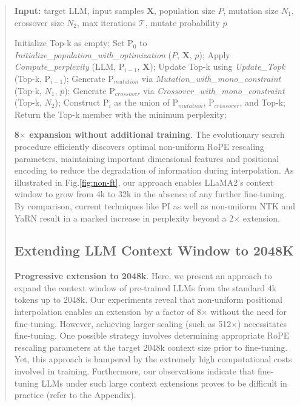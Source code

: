 \begin{abstract}
\begin{algorithm}[t]
	\small
	\caption{The search algorithm}
	\textbf{Input:} target LLM, input samples $\mathbf{X}$,   population size $P$, mutation size $N_1$, crossover size $N_2$, max iterations $\mathcal{T}$, mutate probability $p$\\

	\begin{algorithmic}[1]
		\label{alg:search}
		\STATE Initialize Top-k as empty;	
		\STATE Set $\text{P}_0$ to \textit{Initialize\_population\_with\_optimization} ($P$, $\mathbf{X}$, $p$); 
		\STATE Apply \textit{Compute\_perplexity} (LLM, $\text{P}_{i-1}$, $\mathbf{X}$);
		\STATE  Update Top-k using \textit{Update\_Topk} (Top-k, $\text{P}_{i-1}$);
		\STATE Generate $\text{P}_{mutation}$ via \textit{Mutation\_with\_mono\_constraint} (Top-k, $N_1$, $p$); 
		\STATE Generate $\text{P}_{crossover}$ via \textit{Crossover\_with\_mono\_constraint} (Top-k, $N_2$);
		\STATE Construct $\text{P}_i$ as the union of $\text{P}_{mutation}$, $\text{P}_{crossover}$, and Top-k;
		\ENDFOR
		\STATE Return the Top-k member with the minimum perplexity;
	\end{algorithmic}
\end{algorithm}

\textbf{8$\times$ expansion without additional training}. The evolutionary search procedure efficiently discovers optimal non-uniform RoPE rescaling parameters, maintaining important dimensional features and positional encoding to reduce the degradation of information during interpolation. As illustrated in Fig.\ref{fig:non-ft}, our approach enables LLaMA2’s context window to grow from 4k to 32k in the absence of any further fine-tuning. By comparison, current techniques like PI as well as non-uniform NTK and YaRN result in a marked increase in perplexity beyond a 2$\times$ extension.

\subsection{Extending LLM Context Window to 2048K}
\label{sec:extendto2048k}

\textbf{Progressive extension to 2048k}. Here, we present an approach to expand the context window of pre-trained LLMs from the standard 4k tokens up to 2048k. Our experiments reveal that non-uniform positional interpolation enables an extension by a factor of 8$\times$ without the need for fine-tuning. However, achieving larger scaling (such as 512$\times$) necessitates fine-tuning. One possible strategy involves determining appropriate RoPE rescaling parameters at the target 2048k context size prior to fine-tuning. Yet, this approach is hampered by the extremely high computational costs involved in training. Furthermore, our observations indicate that fine-tuning LLMs under such large context extensions proves to be difficult in practice (refer to the Appendix).


\end{abstract}
